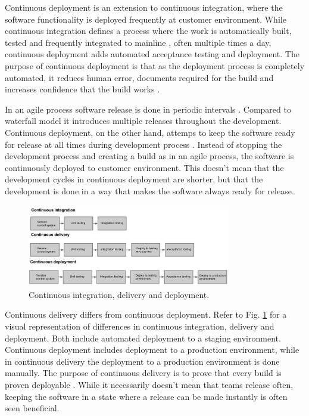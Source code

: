 \documentclass[english]{tktltiki2}
\theoremstyle{definition}
\theoremstyle{remark}
\begin{document}
Continuous deployment is an extension to continuous integration, where the software functionality is deployed frequently at customer environment. While continuous integration defines a process where the work is automatically built, tested and frequently integrated to mainline \cite{fowler2006continuous}, often multiple times a day, continuous deployment adds automated acceptance testing and deployment. The purpose of continuous deployment is that as the deployment process is completely automated, it reduces human error, documents required for the build and increases confidence that the build works \cite{cdbook}. 

In an agile process software release is done in periodic intervals \cite{cockburn2002agile}. Compared to waterfall model it introduces multiple releases throughout the development. Continuous deployment, on the other hand, attemps to keep the software ready for release at all times during development process \cite{cdbook}. Instead of stopping the development process and creating a build as in an agile process, the software is continuously deployed to customer environment. This doesn't mean that the development cycles in continuous deployment are shorter, but that the development is done in a way that makes the software always ready for release.
\begin{figure}[h]
	\centering
	\includegraphics[width=3.5in]{rtvd.jpg}
	\caption{Continuous integration, delivery and deployment.}
	\label{fig1}
\end{figure}
Continuous delivery differs from continuous deployment. Refer to Fig. \ref{fig1} for a visual representation of differences in continuous integration, delivery and deployment. Both include automated deployment to a staging environment. Continuous deployment includes deployment to a production environment, while in continuous delivery the deployment to a production environment is done manually. The purpose of continuous delivery is to prove that every build is proven deployable \cite{cdbook}. While it necessarily doesn't mean that teams release often, keeping the software in a state where a release can be made instantly is often seen beneficial.
\end{document}
